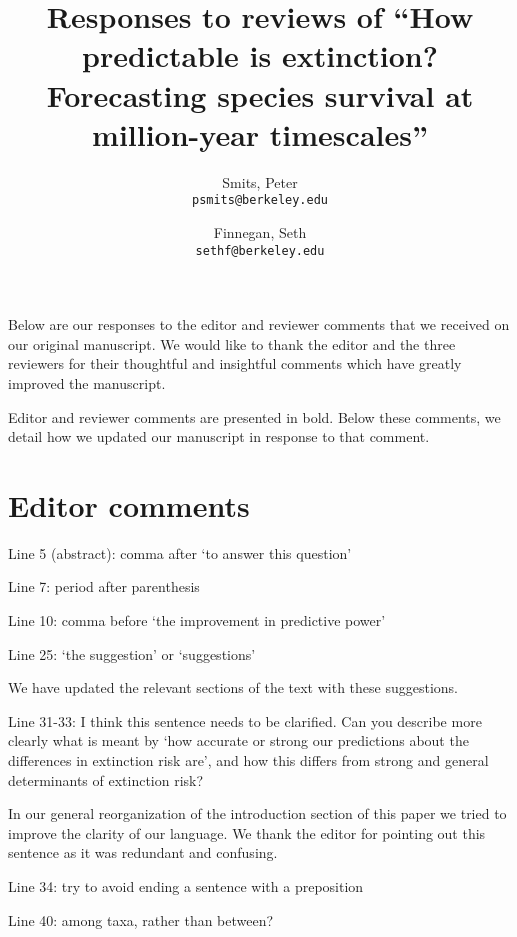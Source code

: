 \documentclass[12pt,letterpaper]{article}
\title{Responses to reviews of ``How predictable is extinction? Forecasting species survival at million-year timescales''}
\author{
 Smits, Peter\\
 \texttt{psmits@berkeley.edu} 
 \and
 Finnegan, Seth\\
 \texttt{sethf@berkeley.edu}
}
\date{}
\begin{document}
\begin{refsection}

\maketitle

\linenumbers{}
\modulolinenumbers[3]


Below are our responses to the editor and reviewer comments that we received on our original manuscript. We would like to thank the editor and the three reviewers for their thoughtful and insightful comments which have greatly improved the manuscript.

Editor and reviewer comments are presented in bold. Below these comments, we detail how we updated our manuscript in response to that comment. 


\section{Editor comments}

\begin{bfseries}
  Line 5 (abstract): comma after ‘to answer this question’

  Line 7: period after parenthesis

  Line 10: comma before ‘the improvement in predictive power’

  Line 25: ‘the suggestion’ or ‘suggestions’
\end{bfseries}

We have updated the relevant sections of the text with these suggestions.


\begin{bfseries}
  Line 31-33: I think this sentence needs to be clarified. Can you describe more clearly what is meant by ‘how accurate or strong our predictions about the differences in extinction risk are’, and how this differs from strong and general determinants of extinction risk?
\end{bfseries}

In our general reorganization of the introduction section of this paper we tried to improve the clarity of our language. We thank the editor for pointing out this sentence as it was redundant and confusing. 


\begin{bfseries}
  Line 34: try to avoid ending a sentence with a preposition 

  Line 40: among taxa, rather than between?


\end{bfseries}
\end{refsection}
\end{document}
